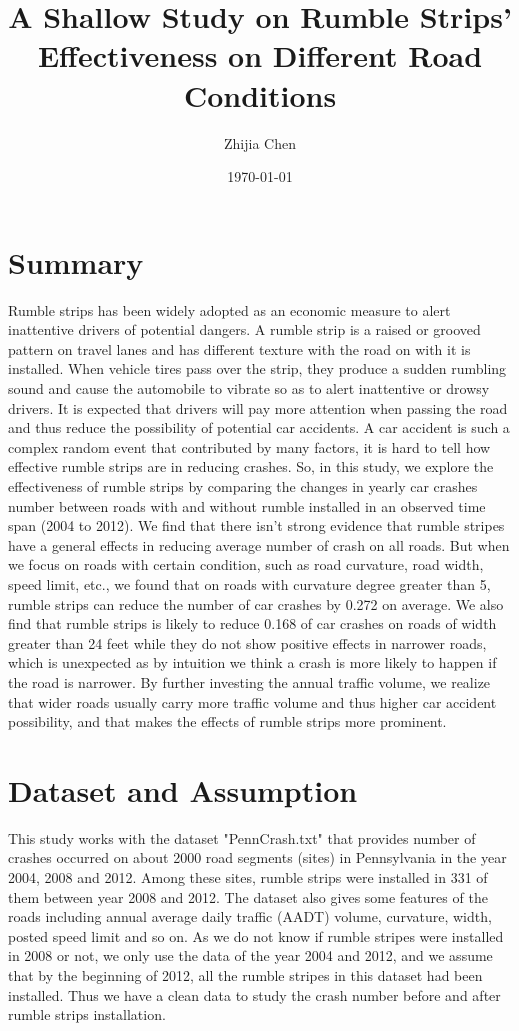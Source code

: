 \documentclass{article}
\title{A Shallow Study on Rumble Strips' Effectiveness on Different Road Conditions}
\author{Zhijia Chen}
\date{\today}
\begin{document}
\begin{titlepage}
    \maketitle
\end{titlepage}

\section*{Summary}
Rumble strips has been widely adopted as an economic measure to alert inattentive drivers of potential dangers. A rumble strip is a raised or grooved pattern on travel lanes and has different texture with the road on with it is installed. When vehicle tires pass over the strip, they produce a sudden rumbling sound and cause the automobile to vibrate so as to alert inattentive or drowsy drivers\cite{corkle2001synthesis}. It is expected that drivers will pay more attention when passing the road and thus reduce the possibility of potential car accidents. A car accident is such a complex random event that contributed by many factors, it is hard to tell how effective rumble strips are in reducing crashes. So, in this study, we explore the effectiveness of rumble strips by comparing the changes in yearly car crashes number between roads with and without rumble installed in an observed time span (2004 to 2012). We find that there isn't strong evidence that rumble stripes have a general effects in reducing average number of crash on all roads. But when we focus on roads with certain condition, such as road curvature, road width, speed limit, etc., we found that on roads with curvature degree greater than 5, rumble strips can reduce the number of car crashes by 0.272 on average. We also find that rumble strips is likely to reduce 0.168 of car crashes on roads of width greater than 24 feet while they do not show positive effects in narrower roads, which is unexpected as by intuition we think a crash is more likely to happen if the road is narrower. By further investing the annual traffic volume, we realize that wider roads usually carry more traffic volume and thus higher car accident possibility, and that makes the effects of rumble strips more prominent.

\section*{Dataset and Assumption}

This study works with the dataset "PennCrash.txt"\cite{data} that provides number of crashes occurred on about 2000 road segments (sites) in Pennsylvania in the year 2004, 2008 and 2012. Among these sites, rumble strips were installed in 331 of them between year 2008 and 2012. The dataset also gives some features of the roads including annual average daily traffic (AADT) volume, curvature, width, posted speed limit and so on. As we do not know if rumble stripes were installed in 2008 or not, we only use the data of the year 2004 and 2012, and we assume that by the beginning of 2012, all the rumble stripes in this dataset had been installed. Thus we have a clean data to study the crash number before and after rumble strips installation.
\end{document}
